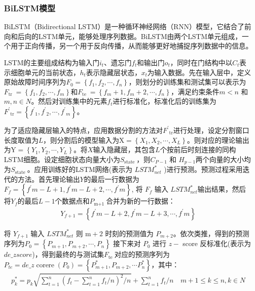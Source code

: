 \documentclass[bwprint]{gmcmthesis}
\begin{document}
\subsubsection{BiLSTM模型}
BiLSTM（Bidirectional LSTM）是一种循环神经网络（RNN）模型，它结合了前向和后向的LSTM单元，能够处理序列数据\cite{siami2019performance}。BiLSTM由两个LSTM单元组成，一个用于正向传播，另一个用于反向传播，从而能够更好地捕捉序列数据中的信息。

LSTM的主要组成结构为输入门$i_t$、遗忘门$f_t$和输出门$o_t$，同时在门结构中以$C_t$表示细胞单元的当前状态，$h_t$表示隐藏层状态，$x_t$为输入数据\cite{yu2019review}。先在输入层中，定义原始故障时间序列为$F_0=\left\{f_1, f_2, \cdots, f_n\right\}$，则划分的训练集和测试集可以表示为$F_{\text {tr }}=\left\{f_1, f_2, \cdots, f_m\right\}$和$F_{\text {te }}=\left\{f_m+1, f_m+2, \cdots, f_n\right\}$，满足约束条件$m<n$ 和 $m, n \in N$。然后对训练集中的元素$f_t$进行标准化，标准化后的训练集为$F^{\prime}{ }_{\mathrm{tr}}=\left\{f^{\prime}{ }_1, f^{\prime}{ }_2, \cdots, f^{\prime}{ }_m\right\}$。

为了适应隐藏层输入的特点，应用数据分割的方法对$F^{\prime}{ }_{\mathrm{tr}}$进行处理，设定分割窗口长度取值为$L$，则分割后的模型输入为$\mathrm{X}=\left\{X_1, X_2, \cdots, X_L\right\}$。则对应的理论输出为$\mathrm{Y}=\left\{Y_1, Y_2, \cdots, Y_L\right\}$。将$X$输入隐藏层，其包含$L$个按前后时刻连接的同构LSTM细胞。设定细胞状态向量大小为$S_{\text {state }}$，则$C_{P-1}$ 和 $H_{p-1}$两个向量的大小均为$S_{\text {state }}$。应用训练好的LSTM网络(表示为 $L S T M_{n e t}^*$ )进行预测。预测过程采用迭代的方法。首先理论输出$Y$的最后一行数据为$F_f=\left\{f^{\prime} m-L+1, f^{\prime} m-L+2, \cdots, f^{\prime} m\right\}$, 将 $F_f$ 输入 $L S T M_{n e t}^*$输出结果，然后将$Y_f$的最后$L-1$个数据点和$P_{\text {m+1 }}$合并为新的一行数据：
\begin{equation}
\begin{aligned}
Y_{f+1}=\left\{f^{\prime} m-L+2, f^{\prime} m-L+3, \cdots, f^{\prime} m\right\}
\end{aligned}
\label{equ:15}
\end{equation}

将 $Y_{f+1}$ 输入 $L S T M_{n e t}^*$ 则 $\mathrm{m}+2$ 时刻的预测值为 $P_{m+2}$。依次类推，得到的预测序列为$P_0=\left\{P_{m+1}, P_{m+2}, \cdots, P_n\right\}$ 接下来对 $P_0$ 进行 $z-$ score 反标准化(表示为 $de\_zscore$)，得到最终的与测试集$F_{\text {te }}$对应的预测序列为$P_{t e}=d e \_z \operatorname{corere}\left(P_0\right)=\left\{P_{m+1}^*, P_{m+2}, \cdots P_n^*\right\}$，其中：
\begin{equation}
\begin{aligned}
p_k^*=p_k \sqrt{\sum_{t=1}^n\left(f_t-\sum_{t=1}^n f_t / n\right)^2 / n}+\sum_{t=1}^n f_t / n \quad m+1 \leq k \leq n, k \in N
\end{aligned}
\label{equ:16}
\end{equation}
\end{document}
